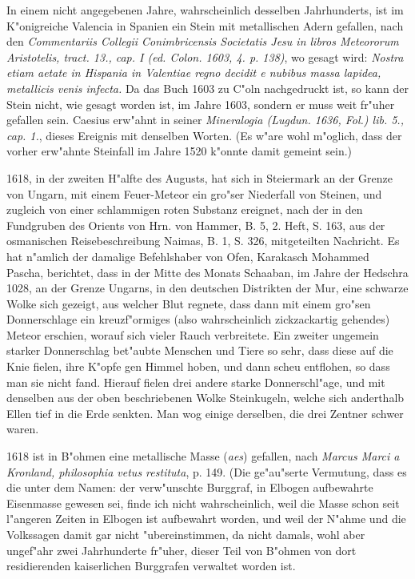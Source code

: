 \documentclass[a4paper, 11pt, oneside, polutonikogreek, german]{article}
\begin{document}
In einem nicht angegebenen Jahre, wahrscheinlich desselben Jahrhunderts, ist im K"onigreiche Valencia in Spanien ein Stein mit metallischen Adern gefallen, nach den \emph{Commentariis Collegii Conimbricensis Societatis Jesu in libros Meteororum Aristotelis, tract. 13., cap. I (ed. Colon. 1603, 4. p. 138)}, wo gesagt wird: \emph{Nostra etiam aetate in Hispania in Valentiae regno decidit e nubibus massa lapidea, metallicis venis infecta.} Da das Buch 1603 zu C"oln nachgedruckt ist, so kann der Stein nicht, wie gesagt worden ist, im Jahre 1603, sondern er muss weit fr"uher gefallen sein. Caesius erw"ahnt in seiner \emph{Mineralogia (Lugdun. 1636, Fol.) lib. 5., cap. 1.}, dieses Ereignis mit denselben Worten. (Es w"are wohl m"oglich, dass der vorher erw"ahnte Steinfall im Jahre 1520 k"onnte damit gemeint sein.)

1618, in der zweiten H"alfte des Augusts, hat sich in Steiermark an der Grenze von Ungarn, mit einem Feuer-Meteor ein gro"ser Niederfall von Steinen, und zugleich von einer schlammigen roten Substanz ereignet, nach der in den Fundgruben des Orients von Hrn. von Hammer, B. 5, 2. Heft, S. 163, aus der osmanischen Reisebeschreibung Naimas, B. 1, S. 326, mitgeteilten Nachricht. Es hat n"amlich der damalige Befehlshaber von Ofen, Karakasch Mohammed Pascha, berichtet, dass in der Mitte des Monats Schaaban, im Jahre der Hedschra 1028, an der Grenze Ungarns, in den deutschen Distrikten der Mur, eine schwarze Wolke sich gezeigt, aus welcher Blut regnete, dass dann mit einem gro"sen Donnerschlage ein kreuzf"ormiges (also wahrscheinlich zickzackartig gehendes) Meteor erschien, worauf sich vieler Rauch verbreitete. Ein zweiter ungemein starker Donnerschlag bet"aubte Menschen und Tiere so sehr, dass diese auf die Knie fielen, ihre K"opfe gen Himmel hoben, und dann scheu entflohen, so dass man sie nicht fand. Hierauf fielen drei andere starke Donnerschl"age, und mit denselben aus der oben beschriebenen Wolke Steinkugeln, welche sich anderthalb Ellen tief in die Erde senkten. Man wog einige derselben, die drei Zentner schwer waren.

1618 ist in B"ohmen eine metallische Masse (\emph{aes}) gefallen, nach \emph{Marcus Marci a Kronland, philosophia vetus restituta}, p. 149. (Die ge"au"serte Vermutung, dass es die unter dem Namen: der verw"unschte Burggraf, in Elbogen aufbewahrte Eisenmasse gewesen sei, finde ich nicht wahrscheinlich, weil die Masse schon seit l"angeren Zeiten in Elbogen ist aufbewahrt worden, und weil der N"ahme und die Volkssagen damit gar nicht "ubereinstimmen, da nicht damals, wohl aber ungef"ahr zwei Jahrhunderte fr"uher, dieser Teil von B"ohmen von dort residierenden kaiserlichen Burggrafen verwaltet worden ist.
\end{document}
